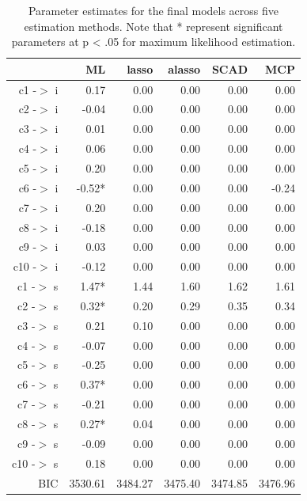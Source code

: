 \documentclass[article]{jss}
\begin{document}
\begin{table}[ht]
    \centering
    \begin{tabular}{rrrrrr}
        \hline
        & ML & lasso & alasso & SCAD & MCP \\ 
        \hline
        c1 -$>$ i & 0.17 & 0.00 & 0.00 & 0.00 & 0.00 \\ 
        c2 -$>$ i & -0.04 & 0.00 & 0.00 & 0.00 & 0.00 \\ 
        c3 -$>$ i & 0.01 & 0.00 & 0.00 & 0.00 & 0.00 \\ 
        c4 -$>$ i & 0.06 & 0.00 & 0.00 & 0.00 & 0.00 \\ 
        c5 -$>$ i & 0.20 & 0.00 & 0.00 & 0.00 & 0.00 \\ 
        c6 -$>$ i & -0.52* & 0.00 & 0.00 & 0.00 & -0.24 \\ 
        c7 -$>$ i & 0.20 & 0.00 & 0.00 & 0.00 & 0.00 \\ 
        c8 -$>$ i & -0.18 & 0.00 & 0.00 & 0.00 & 0.00 \\ 
        c9 -$>$ i & 0.03 & 0.00 & 0.00 & 0.00 & 0.00 \\ 
        c10 -$>$ i & -0.12 & 0.00 & 0.00 & 0.00 & 0.00 \\ 
        c1 -$>$ s & 1.47* & 1.44 & 1.60 & 1.62 & 1.61 \\ 
        c2 -$>$ s & 0.32* & 0.20 & 0.29 & 0.35 & 0.34 \\ 
        c3 -$>$ s & 0.21 & 0.10 & 0.00 & 0.00 & 0.00 \\ 
        c4 -$>$ s & -0.07 & 0.00 & 0.00 & 0.00 & 0.00 \\ 
        c5 -$>$ s & -0.25 & 0.00 & 0.00 & 0.00 & 0.00 \\ 
        c6 -$>$ s & 0.37* & 0.00 & 0.00 & 0.00 & 0.00 \\ 
        c7 -$>$ s & -0.21 & 0.00 & 0.00 & 0.00 & 0.00 \\ 
        c8 -$>$ s & 0.27* & 0.04 & 0.00 & 0.00 & 0.00 \\ 
        c9 -$>$ s & -0.09 & 0.00 & 0.00 & 0.00 & 0.00 \\ 
        c10 -$>$ s & 0.18 & 0.00 & 0.00 & 0.00 & 0.00 \\ 
        BIC & 3530.61 & 3484.27 & 3475.40 & 3474.85 & 3476.96 \\ 
        \hline
    \end{tabular}
\caption{Parameter estimates for the final models across five estimation methods. Note that * represent significant parameters at p < .05 for maximum likelihood estimation.}
\end{table}
\end{document}
